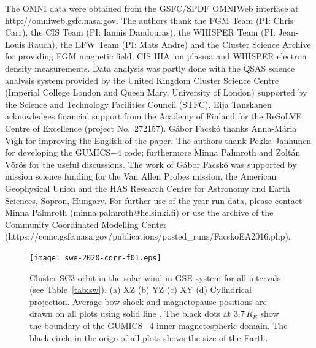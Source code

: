 \documentclass[linenumbers,draft]{agujournal}
\begin{document}
\begin{acknowledgments}
The OMNI data were obtained from the GSFC/SPDF OMNIWeb interface at http://omniweb.gsfc.nasa.gov. The authors thank the FGM Team (PI: Chris Carr), the CIS Team (PI: Iannis Dandouras), the WHISPER Team (PI: Jean-Louis Rauch), the EFW Team (PI: Mats Andre) and the Cluster Science Archive for providing FGM magnetic field, CIS HIA ion plasma and WHISPER electron density measurements. Data analysis was partly done with the QSAS science analysis system provided by the United Kingdom Cluster Science Centre (Imperial College London and Queen Mary, University of London) supported by the Science and Technology Facilities Council (STFC). Eija Tanskanen acknowledges financial support from the Academy of Finland for the ReSoLVE Centre of Excellence (project No.~272157). G{\'a}bor Facsk{\'o} thanks Anna-M\'aria V\'\i gh for improving the English of the paper. The authors thank Pekka Janhunen for developing the GUMICS$-$4 code; furthermore Minna Palmroth and Zolt{\'a}n V{\"o}r{\"o}s for the useful discussions. The work of G{\'a}bor Facsk{\'o} was supported by mission science funding for the Van Allen Probes mission, the American Geophysical Union and the HAS Research Centre for Astronomy and Earth Sciences, Sopron, Hungary. For further use of the year run data, please contact Minna Palmroth (minna.palmroth@helsinki.fi) or use the archive of the Community Coordinated Modelling Center (https://ccmc.gsfc.nasa.gov/publications/posted\_runs/FacskoEA2016.php).
\end{acknowledgments}






\pagebreak

\begin{figure}[h]
\centering
\texttt{[image: swe-2020-corr-f01.eps]}  
\caption{Cluster SC3 orbit in the solar wind in GSE system for all intervals  (see Table~\ref{tab:sw}). (a) XZ (b) YZ (c) XY (d) Cylindrical projection. Average bow-shock and magnetopause positions are drawn on all plots using solid line \citep[][respectively]{peredo95:_three_alfven_mach,tsyganenko95:_model_earth}. The black dots at $3.7\,R_E$ show the boundary of the GUMICS$-$4 inner magnetospheric domain. The black circle in the origo of all plots shows the size of the Earth.}
\label{fig:sworbit}
\end{figure}

\pagebreak
\end{document}
